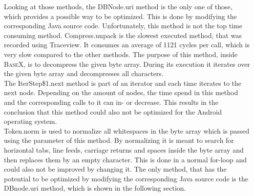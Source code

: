 Looking at those methods, the \textsf{DBNode.uri} method is the only one of those, which provides a possible way to be optimized.
This is done by modifying the corresponding Java source code.
Unfortunately, this method is not the top time consuming method.
\textsf{Compress.unpack} is the slowest executed method, that was recorded using Traceview.
It consumes an average of 1121 cycles per call, which is very slow compared to the other methods.
The purpose of this method, inside \textsc{BaseX}, is to decompress the given byte array.
During its execution it iterates over the given byte array and decompresses all characters.
\\
The \textsf{IterStep\$1.next} method is part of an iterator and each time iterates to the next node.
Depending on the amount of nodes, the time spend in this method and the corresponding calls to it can in- or decrease.
This results in the conclusion that this method could also not be optimized for the Android operating system.
\\
\textsf{Token.norm} is used to normalize all whitespaces in the byte array which is passed using the parameter of this method.
By normalizing it is meant to search for horizontal tabs, line feeds, carriage returns and spaces inside the byte array and then replaces them by an empty character.
This is done in a normal for-loop and could also not be improved by changing it.
The only method, that has the potential to be optimized by modifying the corresponding Java source code is the \textsf{DBnode.uri} method, which is shown in the following section.


